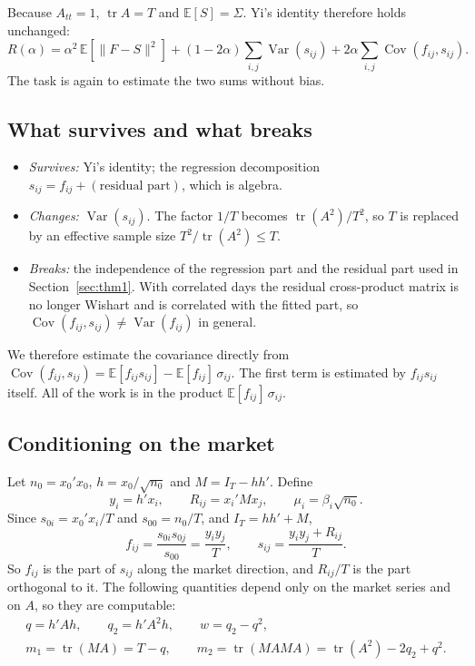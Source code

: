 Because $A_{tt} = 1$, $\operatorname{tr} A = T$ and $\mathbb{E}[S] = \Sigma$. Yi's identity therefore holds unchanged:
\[
  R(\alpha) = \alpha^2\, \mathbb{E}[\|F - S\|^2] + (1 - 2\alpha) \sum_{i,j} \operatorname{Var}(s_{ij}) + 2\alpha \sum_{i,j} \operatorname{Cov}(f_{ij}, s_{ij}).
\]
The task is again to estimate the two sums without bias.

\subsection{What survives and what breaks}

\begin{itemize}
  \item \emph{Survives:} Yi's identity; the regression decomposition $s_{ij} = f_{ij} + (\text{residual part})$, which is algebra.
  \item \emph{Changes:} $\operatorname{Var}(s_{ij})$. The factor $1/T$ becomes $\operatorname{tr}(A^2)/T^2$, so $T$ is replaced by an effective sample size $T^2/\operatorname{tr}(A^2) \leq T$.
  \item \emph{Breaks:} the independence of the regression part and the residual part used in Section~\ref{sec:thm1}. With correlated days the residual cross-product matrix is no longer Wishart and is correlated with the fitted part, so $\operatorname{Cov}(f_{ij}, s_{ij}) \neq \operatorname{Var}(f_{ij})$ in general.
\end{itemize}

We therefore estimate the covariance directly from $\operatorname{Cov}(f_{ij}, s_{ij}) = \mathbb{E}[f_{ij}s_{ij}] - \mathbb{E}[f_{ij}]\,\sigma_{ij}$. The first term is estimated by $f_{ij}s_{ij}$ itself. All of the work is in the product $\mathbb{E}[f_{ij}]\,\sigma_{ij}$.

\subsection{Conditioning on the market}

Let $n_0 = x_0'x_0$, $h = x_0/\sqrt{n_0}$ and $M = I_T - hh'$. Define
\[
  y_i = h'x_i, \qquad R_{ij} = x_i' M x_j, \qquad \mu_i = \beta_i\sqrt{n_0}.
\]
Since $s_{0i} = x_0'x_i/T$ and $s_{00} = n_0/T$, and $I_T = hh' + M$,
\[
  f_{ij} = \frac{s_{0i}s_{0j}}{s_{00}} = \frac{y_iy_j}{T}, \qquad s_{ij} = \frac{y_iy_j + R_{ij}}{T}.
\]
So $f_{ij}$ is the part of $s_{ij}$ along the market direction, and $R_{ij}/T$ is the part orthogonal to it. The following quantities depend only on the market series and on $A$, so they are computable:
\begin{gather*}
  q = h'Ah, \qquad q_2 = h'A^2h, \qquad w = q_2 - q^2, \\
  m_1 = \operatorname{tr}(MA) = T - q, \qquad m_2 = \operatorname{tr}(MAMA) = \operatorname{tr}(A^2) - 2q_2 + q^2.
\end{gather*}

